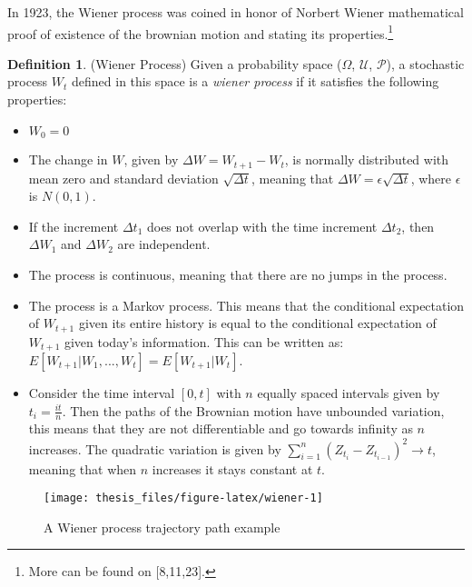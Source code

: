 \documentclass[12pt,twoside]{reedthesis}
\theoremstyle{definition}
\newtheorem{definition}{Definition}[section]
\theoremstyle{definition}
\theoremstyle{remark}
\begin{document}
  In 1923, the Wiener process was coined in honor of Norbert Wiener
  mathematical proof of existence of the brownian motion and stating its
  properties.\footnote{More can be found on {[}8,11,23{]}.}
  \begin{definition}{(Wiener Process)} Given a probability space ($\Omega$, $\mathcal {U}$, $\mathcal {P}$), a stochastic process $W_t$ defined in this space is a \textit{wiener process} if it satisfies the following properties:
  \begin{itemize}
    \item  $W_{0}=0$
    
    \item The change in $W$, given by $\Delta W = W_{t+1}-W_{t}$, is normally distributed with mean zero and standard deviation $\sqrt{\Delta t}$, meaning that $\Delta W = \epsilon\sqrt{\Delta t}$, where $\epsilon$ is $N(0,1)$.
    
    \item If the increment $\Delta t_1$ does not overlap with the time increment $\Delta t_2$, then $\Delta W_1$ and $\Delta W_2$ are independent.
    
    \item The process is continuous, meaning that there are no jumps in the process.
    
    \item The process is a Markov process. This means that the conditional expectation of $W_{t+1}$ given its entire history is equal to the conditional expectation of $W_{t+1}$ given today's information. This can be written as: $E[W_{t+1}|W_1, ..., W_t] = E[W_{t+1}|W_t]$.
    
    \item Consider the time interval $[0,t]$ with $n$ equally spaced intervals given by $t_i = \frac{it}{n}$. Then the paths of the Brownian motion have unbounded variation, this means that they are not differentiable and go towards infinity as $n$ increases. The quadratic variation is given by $\sum_{i=1}^{n}{(Z_{t_i}-Z_{t_{i-1}})^2} \rightarrow t$, meaning that when $n$ increases it stays constant at $t$. 
  
  \end{itemize}
  \end{definition}
  \begin{figure}
  
  {\centering \texttt{[image: thesis\_files/figure-latex/wiener-1]} 
  
  }
  
  \caption{A Wiener process trajectory path example \label{wiener}}\label{fig:wiener}
  \end{figure}
\end{document}
